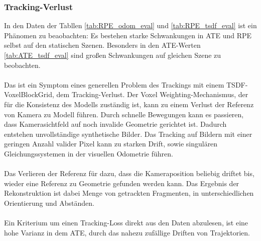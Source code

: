 \documentclass[12pt,DIV=15,BCOR=15mm,twoside,headsepline,abstract=true,listof=totoc,bibliography=totoc]{scrreprt}
\theoremstyle{remark}    %
\begin{document}
    \subsubsection{Tracking-Verlust}
    In den Daten der Tabllen \ref{tab:RPE_odom_eval} und \ref{tab:RPE_tsdf_eval} ist ein Phänomen zu beaobachten: Es bestehen starke Schwankungen 
    in \ac{ATE} und \ac{RPE} selbst auf den statischen Szenen. Besonders in den ATE-Werten \ref{tab:ATE_tsdf_eval} sind großen Schwankungen auf gleichen Szene
    zu beobachten.\\\\
    Das ist ein Symptom eines generellen Problem des Trackings mit einem \ac{TSDF}-VoxelBlockGrid, dem Tracking-Verlust. 
    Der Voxel Weighting-Mechanismus, der für die Konsistenz des Modells zuständig ist, kann zu einem Verlust der Referenz von Kamera zu Modell führen.
    Durch schnelle Bewegungen kann es passieren, dass Kamerasichtfeld auf noch invalide Geometrie gerichtet ist. Dadurch entstehen unvollständige 
    synthetische Bilder. Das Tracking auf Bildern mit einer geringen Anzahl valider Pixel kann zu starken Drift, sowie singulären Gleichungssystemen in der 
    visuellen Odometrie führen.\\\\
    Das Verlieren der Referenz für dazu, dass die Kameraposition beliebig driftet bis, wieder eine Referenz zu Geometrie gefunden werden kann. Das Ergebnis
    der Rekonstruktion ist dabei Menge von getrackten Fragmenten, in unterschiedlichen Orientierung und Abständen.\\\\
    Ein Kriterium um einen Tracking-Loss direkt aus den Daten abzulesen, ist eine hohe Varianz in dem \ac{ATE}, durch das nahezu zufällige Driften von Trajektorien.
\end{document}
